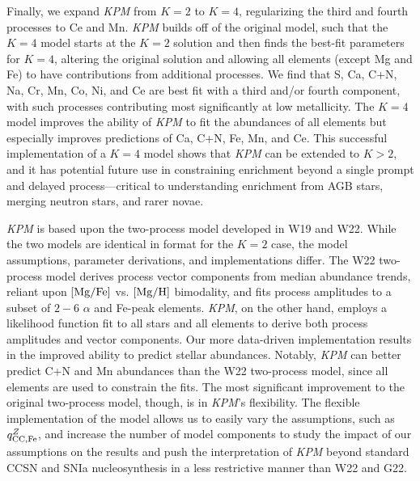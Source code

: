 \documentclass[modern]{aastex631}
\newcommand{\mgfe}[0]{[{\rm Mg/Fe}]}
\newcommand{\mgh}{[{\rm Mg}/{\rm H}]}
\newcommand{\qccFe}{q_{{\rm CC, Fe}}^{Z}}
\newcommand{\name}{\textsl{KPM}}
\begin{document}
Finally, we expand \name{} from $K=2$ to $K=4$, regularizing the third and fourth processes to Ce and Mn. \name{} builds off of the original model, such that the $K=4$ model starts at the $K=2$ solution and then finds the best-fit parameters for $K=4$, altering the original solution and allowing all elements (except Mg and Fe) to have contributions from additional processes. We find that S, Ca, C+N, Na, Cr, Mn, Co, Ni, and Ce are best fit with a third and/or fourth component, with such processes contributing most significantly at low metallicity. The $K=4$ model improves the ability of \name{} to fit the abundances of all elements but especially improves predictions of Ca, C+N, Fe, Mn, and Ce. This successful implementation of a $K=4$ model shows that \name{} can be extended to $K>2$, and it has potential future use in constraining enrichment beyond a single prompt and delayed process---critical to understanding enrichment from AGB stars, merging neutron stars, and rarer novae.

\name{} is based upon the two-process model developed in W19 and W22. While the two models are identical in format for the $K=2$ case, the model assumptions, parameter derivations, and implementations differ. The W22 two-process model derives process vector components from median abundance trends, reliant upon $\mgfe$ vs. $\mgh$ bimodality, and fits process amplitudes to a subset of $2-6$ $\alpha$ and Fe-peak elements. \name{}, on the other hand, employs a likelihood function fit to all stars and all elements to derive both process amplitudes and vector components. Our more data-driven implementation results in the improved ability to predict stellar abundances. Notably, \name{} can better predict C+N and Mn abundances than the W22 two-process model, since all elements are used to constrain the fits. The most significant improvement to the original two-process model, though, is in \name{}'s flexibility. The flexible implementation of the model allows us to easily vary the assumptions, such as $\qccFe$, and increase the number of model components to study the impact of our assumptions on the results and push the interpretation of \name{} beyond standard CCSN and SNIa nucleosynthesis in a less restrictive manner than W22 and G22. 
\end{document}
